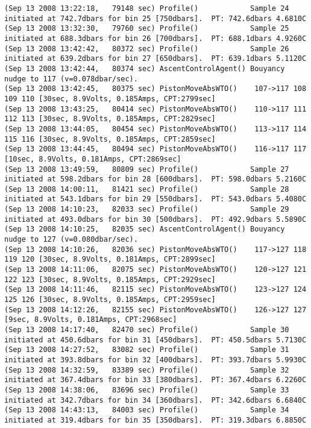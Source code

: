 {\begin{verbatim}
(Sep 13 2008 13:22:18,   79148 sec) Profile()            Sample 24 initiated at 742.7dbars for bin 25 [750dbars].  PT: 742.6dbars 4.6810C
(Sep 13 2008 13:32:30,   79760 sec) Profile()            Sample 25 initiated at 688.3dbars for bin 26 [700dbars].  PT: 688.1dbars 4.9260C
(Sep 13 2008 13:42:42,   80372 sec) Profile()            Sample 26 initiated at 639.2dbars for bin 27 [650dbars].  PT: 639.1dbars 5.1120C
(Sep 13 2008 13:42:44,   80374 sec) AscentControlAgent() Bouyancy nudge to 117 (v=0.078dbar/sec).
(Sep 13 2008 13:42:45,   80375 sec) PistonMoveAbsWTO()    107->117 108 109 110 [30sec, 8.9Volts, 0.185Amps, CPT:2799sec]
(Sep 13 2008 13:43:25,   80414 sec) PistonMoveAbsWTO()    110->117 111 112 113 [30sec, 8.9Volts, 0.185Amps, CPT:2829sec]
(Sep 13 2008 13:44:05,   80454 sec) PistonMoveAbsWTO()    113->117 114 115 116 [30sec, 8.9Volts, 0.185Amps, CPT:2859sec]
(Sep 13 2008 13:44:45,   80494 sec) PistonMoveAbsWTO()    116->117 117 [10sec, 8.9Volts, 0.181Amps, CPT:2869sec]
(Sep 13 2008 13:49:59,   80809 sec) Profile()            Sample 27 initiated at 598.2dbars for bin 28 [600dbars].  PT: 598.0dbars 5.2160C
(Sep 13 2008 14:00:11,   81421 sec) Profile()            Sample 28 initiated at 543.1dbars for bin 29 [550dbars].  PT: 543.0dbars 5.4080C
(Sep 13 2008 14:10:23,   82033 sec) Profile()            Sample 29 initiated at 493.0dbars for bin 30 [500dbars].  PT: 492.9dbars 5.5890C
(Sep 13 2008 14:10:25,   82035 sec) AscentControlAgent() Bouyancy nudge to 127 (v=0.080dbar/sec).
(Sep 13 2008 14:10:26,   82036 sec) PistonMoveAbsWTO()    117->127 118 119 120 [30sec, 8.9Volts, 0.181Amps, CPT:2899sec]
(Sep 13 2008 14:11:06,   82075 sec) PistonMoveAbsWTO()    120->127 121 122 123 [30sec, 8.9Volts, 0.185Amps, CPT:2929sec]
(Sep 13 2008 14:11:46,   82115 sec) PistonMoveAbsWTO()    123->127 124 125 126 [30sec, 8.9Volts, 0.185Amps, CPT:2959sec]
(Sep 13 2008 14:12:26,   82155 sec) PistonMoveAbsWTO()    126->127 127 [9sec, 8.9Volts, 0.181Amps, CPT:2968sec]
(Sep 13 2008 14:17:40,   82470 sec) Profile()            Sample 30 initiated at 450.6dbars for bin 31 [450dbars].  PT: 450.5dbars 5.7130C
(Sep 13 2008 14:27:52,   83082 sec) Profile()            Sample 31 initiated at 393.8dbars for bin 32 [400dbars].  PT: 393.7dbars 5.9930C
(Sep 13 2008 14:32:59,   83389 sec) Profile()            Sample 32 initiated at 367.4dbars for bin 33 [380dbars].  PT: 367.4dbars 6.2260C
(Sep 13 2008 14:38:06,   83696 sec) Profile()            Sample 33 initiated at 342.7dbars for bin 34 [360dbars].  PT: 342.6dbars 6.6840C
(Sep 13 2008 14:43:13,   84003 sec) Profile()            Sample 34 initiated at 319.4dbars for bin 35 [350dbars].  PT: 319.3dbars 6.8850C

\end{verbatim}}
